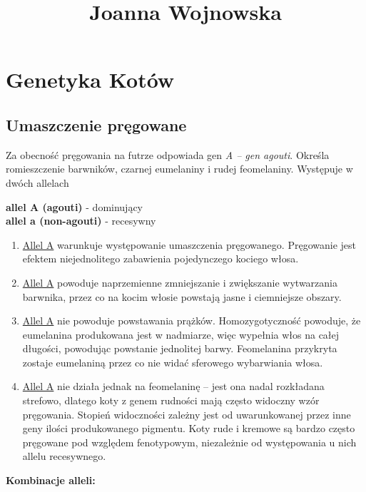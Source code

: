 \begin{center}
\begin{LARGE}
\title{Joanna Wojnowska}
\end{LARGE}
\end{center}
\section{Genetyka Kotów}

\subsection{Umaszczenie pręgowane}
\begin{flushleft}
Za obecność pręgowania na futrze odpowiada gen \textit{A – gen agouti}. Określa romieszczenie barwników, czarnej eumelaniny i rudej feomelaniny. Występuje w dwóch allelach \\
 \begin{center}
\textbf{allel A (agouti)} - dominujący\\
\textbf{allel a (non-agouti)} - recesywny
\end{center}
\begin{enumerate}
    
    \item \underline{Allel A} warunkuje występowanie umaszczenia pręgowanego. Pręgowanie jest efektem niejednolitego zabawienia pojedynczego kociego włosa. \item \underline{Allel A} powoduje naprzemienne zmniejszanie i zwiększanie wytwarzania barwnika, przez co na kocim włosie powstają jasne i ciemniejsze obszary.
    \item \underline{Allel A} nie powoduje powstawania prążków. Homozygotyczność powoduje, że eumelanina produkowana jest w nadmiarze, więc wypełnia włos na całej długości, powodując powstanie jednolitej barwy. Feomelanina przykryta zostaje eumelaniną przez co nie widać sferowego wybarwiania włosa. 
    \item \underline{Allel A} nie działa jednak na feomelaninę – jest ona nadal rozkładana strefowo, dlatego koty z genem rudności mają często widoczny wzór pręgowania. Stopień widoczności zależny jest od uwarunkowanej przez inne geny ilości produkowanego pigmentu. Koty rude i kremowe są bardzo często pręgowane pod względem fenotypowym, niezależnie od występowania u nich allelu recesywnego.
\end{enumerate}
\par
\begin{center}
\textbf{Kombinacje alleli:}
\end{center}


\end{flushleft}
